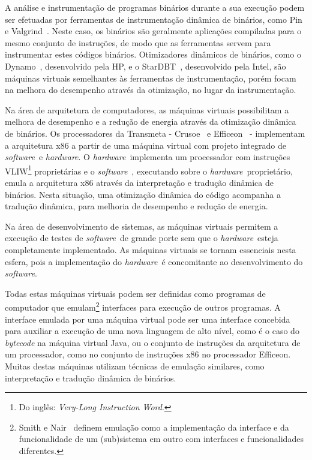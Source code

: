 \documentclass[a4paper,12pt]{article}
\newcommand{\software}{\emph{software}}
\newcommand{\hardware}{\emph{hardware}}
\begin{document}
A análise e instrumentação de programas binários durante a sua execução podem
ser efetuadas por ferramentas de instrumentação dinâmica de binários, como
Pin~\cite{pin} e Valgrind~\cite{val}. Neste caso, os binários são geralmente
aplicações compiladas para o mesmo conjunto de instruções, de modo que as
ferramentas servem para instrumentar estes códigos binários. Otimizadores
dinâmicos de binários, como o Dynamo~\cite{dyn}, desenvolvido pela HP, e o
StarDBT~\cite{star}, desenvolvido pela Intel, são máquinas virtuais semelhantes
às ferramentas de instrumentação, porém focam na melhora do desempenho através
da otimização, no lugar da instrumentação.

Na área de arquitetura de computadores, as máquinas virtuais possibilitam a
melhora de desempenho e a redução de energia através da otimização dinâmica de
binários. Os processadores da Transmeta - Crusoe~\cite{halfhill} e
Efficeon~\cite{Kre03} - implementam a arquitetura x86 a partir de uma máquina
virtual com projeto integrado de \software\ e \hardware. O \hardware\ implementa
um processador com instruções VLIW\footnote{Do inglês: \emph{Very-Long
    Instruction Word}.} proprietárias e o \software~\cite{soft}, executando
sobre o \hardware\ proprietário, emula a arquitetura x86 através da
interpretação e tradução dinâmica de binários. Nesta situação, uma otimização
dinâmica do código acompanha a tradução dinâmica, para melhoria de desempenho e
redução de energia.

Na área de desenvolvimento de sistemas, as máquinas virtuais permitem a execução
de testes de \software\ de grande porte sem que o \hardware\ esteja
completamente implementado. As máquinas virtuais se tornam essenciais nesta
esfera, pois a implementação do \hardware\ é concomitante ao desenvolvimento do
\software.

Todas estas máquinas virtuais podem ser definidas como programas de computador
que emulam\footnote{Smith e Nair~\cite{smith_nair_2} definem emulação como a
  implementação da interface e da funcionalidade de um (sub)sistema em outro com
  interfaces e funcionalidades diferentes.} interfaces para execução de outros
programas. A interface emulada por uma máquina virtual pode ser uma interface
concebida para auxiliar a execução de uma nova linguagem de alto nível, como é o
caso do \emph{bytecode} na máquina virtual Java, ou o conjunto de instruções da
arquitetura de um processador, como no conjunto de instruções x86 no processador
Efficeon. Muitas destas máquinas utilizam técnicas de emulação similares, como
interpretação e tradução dinâmica de binários.
\end{document}

